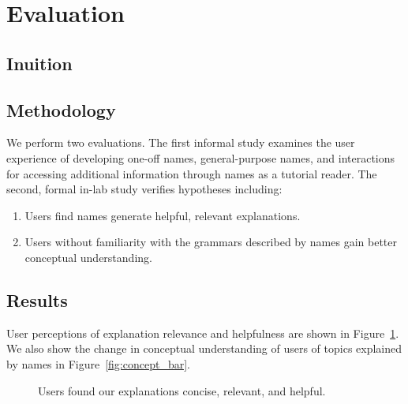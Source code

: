 \section{Evaluation}

\subsection{Inuition}

\subsection{Methodology}

We perform two evaluations.
The first informal study examines the user experience of developing one-off \glspl{name}, general-purpose \glspl{name}, and interactions for accessing additional information through \glspl{name} as a tutorial reader.
The second, formal in-lab study verifies hypotheses including:
\noindent
\begin{enumerate}%
\item Users find \glspl{name} generate helpful, relevant explanations.
\item Users without familiarity with the grammars described by \glspl{name} gain better conceptual understanding.
\end{enumerate}

\subsection{Results}

User perceptions of explanation relevance and helpfulness are shown in Figure~\ref{fig:user_study_bar}.
We also show the change in conceptual understanding of users of topics explained by \glspl{name} in Figure~\ref{fig:concept_bar}.

\begin{figure}
\caption{Users found our explanations concise, relevant, and helpful.}
\label{fig:user_study_bar}
\end{figure}
